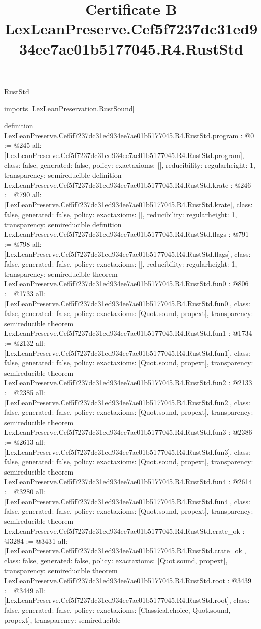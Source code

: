 \begin{lexlean}{RustStd}
\title{Certificate B LexLeanPreserve.Cef5f7237dc31ed934ee7ae01b5177045.R4.RustStd}
\begin{coremodule}
imports [LexLeanPreservation.RustSound]

definition LexLeanPreserve.Cef5f7237dc31ed934ee7ae01b5177045.R4.RustStd.program : @0 := @245 {
  all: [LexLeanPreserve.Cef5f7237dc31ed934ee7ae01b5177045.R4.RustStd.program],
  class: false,
  generated: false,
  policy: exact{axioms: []},
  reducibility: regular{height: 1},
  transparency: semireducible
}
definition LexLeanPreserve.Cef5f7237dc31ed934ee7ae01b5177045.R4.RustStd.krate : @246 := @790 {
  all: [LexLeanPreserve.Cef5f7237dc31ed934ee7ae01b5177045.R4.RustStd.krate],
  class: false,
  generated: false,
  policy: exact{axioms: []},
  reducibility: regular{height: 1},
  transparency: semireducible
}
definition LexLeanPreserve.Cef5f7237dc31ed934ee7ae01b5177045.R4.RustStd.flags : @791 := @798 {
  all: [LexLeanPreserve.Cef5f7237dc31ed934ee7ae01b5177045.R4.RustStd.flags],
  class: false,
  generated: false,
  policy: exact{axioms: []},
  reducibility: regular{height: 1},
  transparency: semireducible
}
theorem LexLeanPreserve.Cef5f7237dc31ed934ee7ae01b5177045.R4.RustStd.fun0 : @806 := @1733 {
  all: [LexLeanPreserve.Cef5f7237dc31ed934ee7ae01b5177045.R4.RustStd.fun0],
  class: false,
  generated: false,
  policy: exact{axioms: [Quot.sound, propext]},
  transparency: semireducible
}
theorem LexLeanPreserve.Cef5f7237dc31ed934ee7ae01b5177045.R4.RustStd.fun1 : @1734 := @2132 {
  all: [LexLeanPreserve.Cef5f7237dc31ed934ee7ae01b5177045.R4.RustStd.fun1],
  class: false,
  generated: false,
  policy: exact{axioms: [Quot.sound, propext]},
  transparency: semireducible
}
theorem LexLeanPreserve.Cef5f7237dc31ed934ee7ae01b5177045.R4.RustStd.fun2 : @2133 := @2385 {
  all: [LexLeanPreserve.Cef5f7237dc31ed934ee7ae01b5177045.R4.RustStd.fun2],
  class: false,
  generated: false,
  policy: exact{axioms: [Quot.sound, propext]},
  transparency: semireducible
}
theorem LexLeanPreserve.Cef5f7237dc31ed934ee7ae01b5177045.R4.RustStd.fun3 : @2386 := @2613 {
  all: [LexLeanPreserve.Cef5f7237dc31ed934ee7ae01b5177045.R4.RustStd.fun3],
  class: false,
  generated: false,
  policy: exact{axioms: [Quot.sound, propext]},
  transparency: semireducible
}
theorem LexLeanPreserve.Cef5f7237dc31ed934ee7ae01b5177045.R4.RustStd.fun4 : @2614 := @3280 {
  all: [LexLeanPreserve.Cef5f7237dc31ed934ee7ae01b5177045.R4.RustStd.fun4],
  class: false,
  generated: false,
  policy: exact{axioms: [Quot.sound, propext]},
  transparency: semireducible
}
theorem LexLeanPreserve.Cef5f7237dc31ed934ee7ae01b5177045.R4.RustStd.crate_ok : @3284 := @3431 {
  all: [LexLeanPreserve.Cef5f7237dc31ed934ee7ae01b5177045.R4.RustStd.crate_ok],
  class: false,
  generated: false,
  policy: exact{axioms: [Quot.sound, propext]},
  transparency: semireducible
}
theorem LexLeanPreserve.Cef5f7237dc31ed934ee7ae01b5177045.R4.RustStd.root : @3439 := @3449 {
  all: [LexLeanPreserve.Cef5f7237dc31ed934ee7ae01b5177045.R4.RustStd.root],
  class: false,
  generated: false,
  policy: exact{axioms: [Classical.choice, Quot.sound, propext]},
  transparency: semireducible
}


\end{coremodule}
\end{lexlean}
